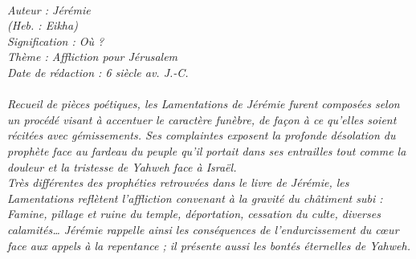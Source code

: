 \BFont
\noindent\hrulefill
{\footnotesize
\textit{
\bigskip
{\centering{}
\\Auteur : Jérémie
\\(Heb. : Eikha)
\\Signification : Où ?
\\Thème : Affliction pour Jérusalem
\\Date de rédaction : 6 siècle av. J.-C.\\}
}
\textit{
\\Recueil de pièces poétiques, les Lamentations de Jérémie furent composées selon un procédé visant à accentuer le caractère funèbre, de façon à ce qu'elles soient récitées avec gémissements. Ses complaintes exposent la profonde désolation du prophète face au fardeau du peuple qu'il portait dans ses entrailles tout comme la douleur et la tristesse de Yahweh face à Israël.
\\Très différentes des prophéties retrouvées dans le livre de Jérémie, les Lamentations reflètent l'affliction convenant à la gravité du châtiment subi : Famine, pillage et ruine du temple, déportation, cessation du culte, diverses calamités… Jérémie rappelle ainsi les conséquences de l'endurcissement du cœur face aux appels à la repentance ; il présente aussi les bontés éternelles de Yahweh.\bigskip
}
}
\par\nobreak\noindent\hrulefill
